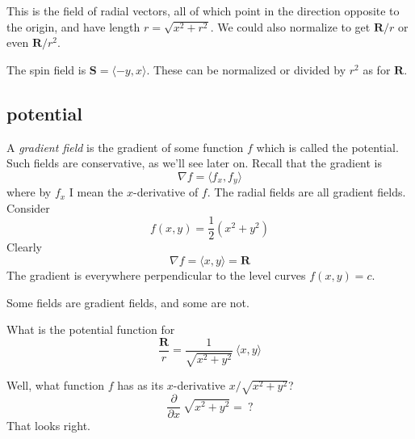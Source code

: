 \documentclass[11pt, oneside]{article}   	%
\begin{document}
This is the field of radial vectors, all of which point in the direction opposite to the origin, and have length $r = \sqrt{x^2 + r^2}$.  We could also normalize to get $\mathbf{R}/r$ or even $\mathbf{R}/r^2$.

The spin field is $\mathbf{S} = \langle -y,x \rangle$.  These can be normalized or divided by $r^2$ as for $\mathbf{R}$.

\subsection*{potential}

A \emph{gradient field} is the gradient of some function $f$ which is called the potential.  Such fields are conservative, as we'll see later on.  Recall that the gradient is
\[ \nabla f = \langle f_x, f_y \rangle \]
where by $f_x$ I mean the $x$-derivative of $f$.  The radial fields are all gradient fields.  Consider
\[ f(x,y) = \frac{1}{2}(x^2 + y^2) \]
Clearly
\[ \nabla f = \langle x, y \rangle = \mathbf{R} \]
The gradient is everywhere perpendicular to the level curves $f(x,y) = c$.

Some fields are gradient fields, and some are not.

What is the potential function for 
\[ \frac{\mathbf{R}}{r} = \frac{1}{\sqrt{x^2 + y^2}} \  \langle x,y \rangle \]

Well, what function $f$ has as its $x$-derivative $x/\sqrt{x^2 + y^2}$?
\[ \frac{\partial}{\partial x} \  \sqrt{x^2 + y^2} =  \ ?\]
That looks right.
\end{document}
